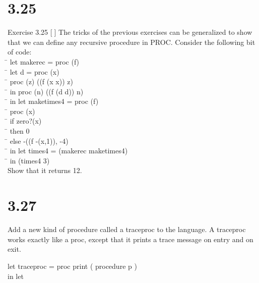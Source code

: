 \documentclass{article}
\begin{document}
\begin{tab}
\section{3.25}
Exercise 3.25 [] The tricks of the previous exercises can be generalized to show that we can define any recursive procedure in PROC. Consider the following bit of code:\\
\= \> let makerec = proc (f)\\
\= \> \> let d = proc (x)\\
\= \> \>\> proc (z) ((f (x x)) z)\\
\= \> \>in proc (n) ((f (d d)) n)\\
\= \> in let maketimes4 = proc (f)\\
\= \> \> proc (x)\\
\= \> \> if zero?(x)\\
\= \> \> then 0\\
\= \> \> else -((f -(x,1)), -4)\\
\= \> in let times4 = (makerec maketimes4)\\
\= \> \> in (times4 3)\\
Show that it returns 12.

\newpage
\section{3.27}
Add a new kind of procedure called a traceproc to the language. A traceproc works exactly like a proc, except that it prints a trace message on entry and on exit.

let traceproc = proc print ( procedure p )\\
in let 
    
\end{tab}
\end{document}
